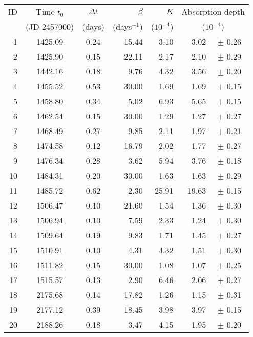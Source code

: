 \begin{table*}
\begin{tabular}{r|ccrrrc}
\hline
ID  & Time $t_0$ & $\Delta t$ & $\beta$ & $K$ & \multicolumn{2}{r}{Absorption depth}\\
    & (JD-2457000) & (days) & (days$^{-1}$)  & ($10^{-4}$) &
    \multicolumn{2}{c}{($10^{-4}$)}\\
\hline
  1 &   1425.09 &    0.24 &   15.44 &    3.10 &    3.02 & $\pm$   0.26 \\
  2 &   1425.90 &    0.15 &   22.11 &    2.17 &    2.10 & $\pm$   0.29 \\
  3 &   1442.16 &    0.18 &    9.76 &    4.32 &    3.56 & $\pm$   0.20 \\
  4 &   1455.52 &    0.53 &   30.00 &    1.69 &    1.69 & $\pm$   0.15 \\
  5 &   1458.80 &    0.34 &    5.02 &    6.93 &    5.65 & $\pm$   0.15 \\
  6 &   1462.54 &    0.15 &   30.00 &    1.29 &    1.27 & $\pm$   0.27 \\
  7 &   1468.49 &    0.27 &    9.85 &    2.11 &    1.97 & $\pm$   0.21 \\
  8 &   1474.58 &    0.12 &   16.79 &    2.02 &    1.77 & $\pm$   0.27 \\
  9 &   1476.34 &    0.28 &    3.62 &    5.94 &    3.76 & $\pm$   0.18 \\
 10 &   1484.31 &    0.20 &   30.00 &    1.63 &    1.63 & $\pm$   0.29 \\
 11 &   1485.72 &    0.62 &    2.30 &   25.91 &   19.63 & $\pm$   0.15 \\
 12 &   1506.47 &    0.10 &   21.60 &    1.54 &    1.36 & $\pm$   0.30 \\
 13 &   1506.94 &    0.10 &    7.59 &    2.33 &    1.24 & $\pm$   0.30 \\
 14 &   1509.64 &    0.19 &    9.83 &    1.71 &    1.45 & $\pm$   0.27 \\
 15 &   1510.91 &    0.10 &    4.31 &    4.32 &    1.51 & $\pm$   0.30 \\
 16 &   1511.82 &    0.15 &   30.00 &    1.08 &    1.07 & $\pm$   0.25 \\
 17 &   1515.57 &    0.13 &    2.90 &    6.46 &    2.06 & $\pm$   0.27 \\
 18 &   2175.68 &    0.14 &   17.82 &    1.26 &    1.15 & $\pm$   0.31 \\
 19 &   2177.12 &    0.39 &   18.45 &    3.98 &    3.97 & $\pm$   0.15 \\
 20 &   2188.26 &    0.18 &    3.47 &    4.15 &    1.95 & $\pm$   0.20 \\

\end{tabular}
\end{table*}
